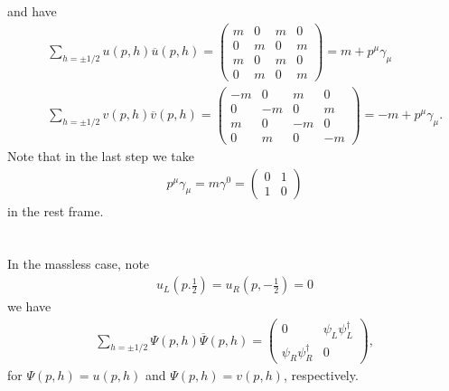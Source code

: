 \documentclass[11pt]{article}
\begin{document}
and have
\begin{eqnarray}
    &&\sum_{h=\pm1/2} u(p,h) {\overline u}(p,h)=
    \begin{pmatrix}
        m & 0 & m & 0 \\
        0 & m & 0 & m \\
        m & 0 & m & 0 \\
        0 & m & 0 & m 
    \end{pmatrix}
    = m + p^\mu \gamma_\mu \\
    &&\sum_{h=\pm1/2} v(p,h) {\overline v}(p,h)=
    \begin{pmatrix}
        -m & 0 & m & 0 \\
        0 & -m & 0 & m \\
        m & 0 & -m & 0 \\
        0 & m & 0 & -m 
    \end{pmatrix}
    = -m + p^\mu \gamma_\mu.
\end{eqnarray}
Note that in the last step we take
\begin{eqnarray}
    p^\mu \gamma_\mu = m \gamma^0 =
    \begin{pmatrix}
        0 & 1\\
        1 & 0
    \end{pmatrix}
\end{eqnarray}
in the rest frame.

\section{ }
In the massless case, note 
\begin{eqnarray}
    u_L(p.\frac{1}{2})=u_R(p,-\frac{1}{2})=0
\end{eqnarray}
we have
\begin{eqnarray}
    \sum_{h=\pm1/2} \Psi(p,h) {\overline \Psi}(p,h) =
    \begin{pmatrix}
        0 & \psi_L\psi_L^\dagger \\
        \psi_R\psi_R^\dagger  & 0
    \end{pmatrix}, 
\end{eqnarray}
for $\Psi(p,h)=u(p,h)$ and $\Psi(p,h)=v(p,h)$, respectively.
\end{document}
